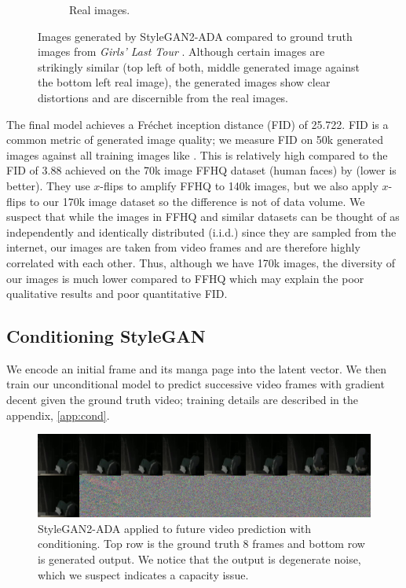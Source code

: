 \documentclass[11pt, oneside]{article}
\begin{document}
\begin{figure}[h!]
\begin{subfigure}[h]{0.49 \textwidth}
      \caption{Real images.}
    \end{subfigure}
    \caption{Images generated by StyleGAN2-ADA \cite{stylegan2ada} compared to
      ground truth images from \textit{Girls' Last Tour} \cite{tour}. Although
      certain images are strikingly similar (top left of both, middle generated
      image against the bottom left real image), the generated images show
      clear distortions and are discernible from the real images.}
    \label{fig:samples}
\end{figure}

The final model achieves a Fréchet inception distance (FID) of 25.722.
FID is a common metric of generated image quality; we measure FID on 50k
generated images against all training images like \cite{stylegan2ada}. This
is relatively high compared to the FID of 3.88 achieved on the 70k image
FFHQ dataset (human faces) by \cite{stylegan2ada} (lower is better). They
use \( x \)-flips to amplify FFHQ to 140k images, but we also apply \( x
\)-flips to our 170k image dataset so the difference is not of data volume.
We suspect that while the images in FFHQ and similar datasets can be thought
of as independently and identically distributed (i.i.d.) since they are
sampled from the internet, our images are taken from video frames and are
therefore highly correlated with each other. Thus, although we have 170k
images, the diversity of our images is much lower compared to FFHQ which
may explain the poor qualitative results and poor quantitative FID.

\subsection{Conditioning StyleGAN}
We encode an initial frame and its manga page into the latent vector. We
then train our unconditional model to predict successive video frames
with gradient decent given the ground truth video; training details are
described in the appendix, \autoref{app:cond}.

\begin{figure}[h!]
  \centering
  \includegraphics[scale=0.2]{results_gen}
  \caption{StyleGAN2-ADA \cite{stylegan2ada} applied to future video
    prediction with conditioning. Top row is the ground truth 8 frames
    and bottom row is generated output. We notice that the output is
    degenerate noise, which we suspect indicates a capacity issue.}
  \label{fig:gen}
\end{figure}
\end{document}
